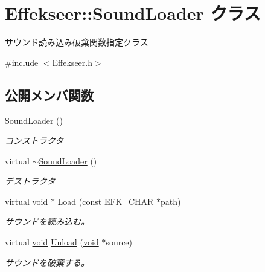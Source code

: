 \hypertarget{class_effekseer_1_1_sound_loader}{}\section{Effekseer\+:\+:Sound\+Loader クラス}
\label{class_effekseer_1_1_sound_loader}


サウンド読み込み破棄関数指定クラス  




{\ttfamily \#include $<$Effekseer.\+h$>$}

\subsection*{公開メンバ関数}
\begin{DoxyCompactItemize}
\item 
\mbox{\hyperlink{class_effekseer_1_1_sound_loader_a8c1e855efae5426d991a534950ffd0d2}{Sound\+Loader}} ()
\begin{DoxyCompactList}\small\item\em コンストラクタ \end{DoxyCompactList}\item 
virtual \mbox{\hyperlink{class_effekseer_1_1_sound_loader_af0d4636a5348e45dfadf0e0a8847d4c1}{$\sim$\+Sound\+Loader}} ()
\begin{DoxyCompactList}\small\item\em デストラクタ \end{DoxyCompactList}\item 
virtual \mbox{\hyperlink{namespace_effekseer_ab34c4088e512200cf4c2716f168deb56}{void}} $\ast$ \mbox{\hyperlink{class_effekseer_1_1_sound_loader_a871ad4843c0dee971d897a654643bdef}{Load}} (const \mbox{\hyperlink{_effekseer_8h_aca7eb5de6dd019c19ac58ea35a193f2f}{E\+F\+K\+\_\+\+C\+H\+AR}} $\ast$path)
\begin{DoxyCompactList}\small\item\em サウンドを読み込む。 \end{DoxyCompactList}\item 
virtual \mbox{\hyperlink{namespace_effekseer_ab34c4088e512200cf4c2716f168deb56}{void}} \mbox{\hyperlink{class_effekseer_1_1_sound_loader_aa0b0fda4cbd0f9a6b9bf1babaef93679}{Unload}} (\mbox{\hyperlink{namespace_effekseer_ab34c4088e512200cf4c2716f168deb56}{void}} $\ast$source)
\begin{DoxyCompactList}\small\item\em サウンドを破棄する。 \end{DoxyCompactList}\end{DoxyCompactItemize}


